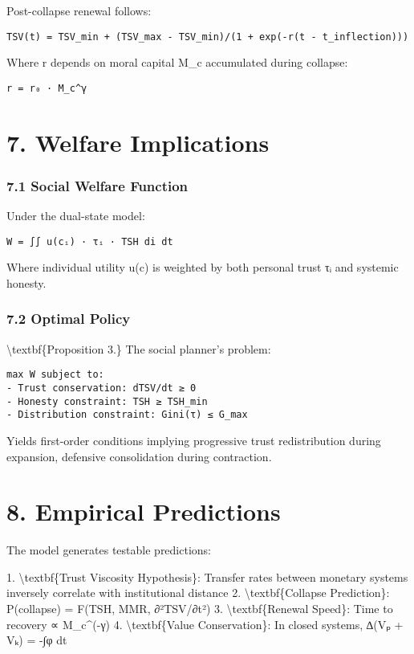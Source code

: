 \documentclass[11pt,oneside]{book}
\begin{document}
Post-collapse renewal follows:

\begin{verbatim}
TSV(t) = TSV_min + (TSV_max - TSV_min)/(1 + exp(-r(t - t_inflection)))
\end{verbatim}

Where r depends on moral capital M\_c accumulated during collapse:

\begin{verbatim}
r = r₀ · M_c^γ
\end{verbatim}

\section{7. Welfare Implications}

\subsubsection{7.1 Social Welfare Function}

Under the dual-state model:

\begin{verbatim}
W = ∫∫ u(cᵢ) · τᵢ · TSH di dt
\end{verbatim}

Where individual utility u(c) is weighted by both personal trust τᵢ and systemic honesty.

\subsubsection{7.2 Optimal Policy}

\textbackslash textbf\{Proposition 3.\} The social planner's problem:

\begin{verbatim}
max W subject to:
- Trust conservation: dTSV/dt ≥ 0
- Honesty constraint: TSH ≥ TSH_min  
- Distribution constraint: Gini(τ) ≤ G_max
\end{verbatim}

Yields first-order conditions implying progressive trust redistribution during expansion, defensive consolidation during contraction.

\section{8. Empirical Predictions}

The model generates testable predictions:

1. \textbackslash textbf\{Trust Viscosity Hypothesis\}: Transfer rates between monetary systems inversely correlate with institutional distance
2. \textbackslash textbf\{Collapse Prediction\}: P(collapse) = F(TSH, MMR, ∂²TSV/∂t²)
3. \textbackslash textbf\{Renewal Speed\}: Time to recovery ∝ M\_c\textasciicircum (-γ)
4. \textbackslash textbf\{Value Conservation\}: In closed systems, ∆(Vₚ + Vₖ) = -∫φ dt
\end{document}
